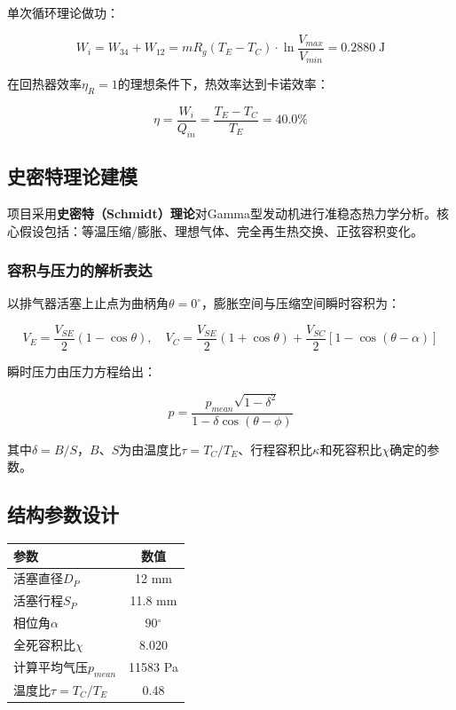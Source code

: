\documentclass[12pt,a4paper]{ctexart}
\begin{document}
单次循环理论做功：

\[
W_i = W_{34} + W_{12} = mR_g(T_E - T_C) \cdot \ln\frac{V_{max}}{V_{min}} = 0.2880\;\text{J}
\]

在回热器效率$\eta_R = 1$的理想条件下，热效率达到卡诺效率：

\[
\eta = \frac{W_i}{Q_{in}} = \frac{T_E - T_C}{T_E} = 40.0\%
\]

\subsection{史密特理论建模}

项目采用\textbf{史密特（Schmidt）理论}对Gamma型发动机进行准稳态热力学分析。核心假设包括：等温压缩/膨胀、理想气体、完全再生热交换、正弦容积变化。

\subsubsection{容积与压力的解析表达}

以排气器活塞上止点为曲柄角$\theta = 0^\circ$，膨胀空间与压缩空间瞬时容积为：

\[
V_E = \frac{V_{SE}}{2}(1 - \cos\theta), \quad V_C = \frac{V_{SE}}{2}(1 + \cos\theta) + \frac{V_{SC}}{2}[1 - \cos(\theta - \alpha)]
\]

瞬时压力由压力方程给出：

\[
p = \frac{p_{mean}\sqrt{1 - \delta^2}}{1 - \delta\cos(\theta - \phi)}
\]

其中$\delta = B/S$，$B$、$S$为由温度比$\tau = T_C/T_E$、行程容积比$\kappa$和死容积比$\chi$确定的参数。

\subsection{结构参数设计}

\begin{center}
\begin{tabular}{lc}
\toprule
\textbf{参数} & \textbf{数值} \\
\midrule
活塞直径$D_P$ & 12 mm \\
活塞行程$S_P$ & 11.8 mm \\
相位角$\alpha$ & 90$^\circ$ \\
全死容积比$\chi$ & 8.020 \\
计算平均气压$p_{mean}$ & 11583 Pa \\
温度比$\tau = T_C/T_E$ & 0.48 \\
\bottomrule
\end{tabular}
\end{center}
\end{document}
